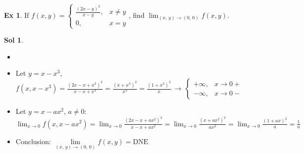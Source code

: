 \documentclass[12pt]{extarticle}
\newcommand{\ds}{\displaystyle}
\theoremstyle{definition}
\newtheorem*{ex}{Ex}
\newtheorem*{sol}{Sol}
\begin{document}
\begin{ex}
  If $\ds f(x,y) = \begin{cases}\frac{(2x-y)^2}{x-y}, & x\ne y\\0, & x = y\end{cases}$, find $\ds\lim_{(x,\,y)\to (0,\,0)} f(x,y)$. 
\end{ex}
\begin{sol}
  \begin{itemize}\setlength{\itemsep}{0pt}
    \item[]
    \item Let $y = x - x^3$, $\ds f(x,x - x^3) = \frac{{(2 x - x + x^3)}^2}{x - x + x^3} = \frac{{(x + x^3)}^2}{x^3} = \frac{{(1 + x^2)}^2}{x}\,\longrightarrow\,\begin{cases}+\infty, & x\to 0+\\-\infty, & x\to 0-\end{cases}$
    \item Let $y = x - ax^2$, $a\ne 0$: $\ds\lim_{x\to 0}f(x,x - a x^2) = \lim_{x\to 0}\frac{{(2x - x + a x^2)}^2}{x - x + a x^2} = \lim_{x\to 0}\frac{{(x + a x^2)}^2}{a x^2} = \lim_{x\to 0}\frac{{(1 + a x)}^2}{a} = \frac{1}{a}$
    \item Conclusion: $\ds\lim\limits_{(x,\,y)\to(0,\,0)}f(x,y) = \text{DNE}$
  \end{itemize}
\end{sol}
\end{document}
